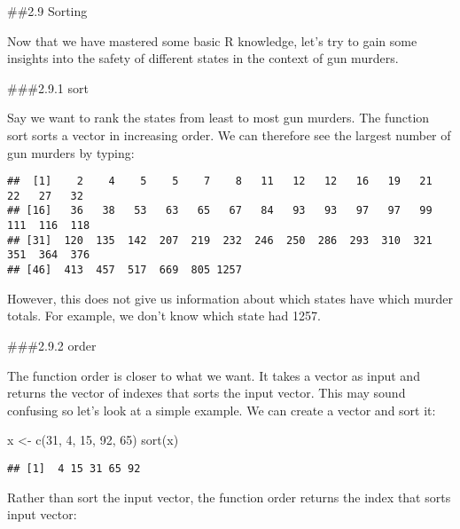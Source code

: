 \documentclass[
]{article}
\newenvironment{Shaded}{\begin{snugshade}}{\end{snugshade}}
\newcommand{\DecValTok}[1]{\textcolor[rgb]{0.00,0.00,0.81}{#1}}
\newcommand{\FunctionTok}[1]{\textcolor[rgb]{0.00,0.00,0.00}{#1}}
\newcommand{\NormalTok}[1]{#1}
\newcommand{\OtherTok}[1]{\textcolor[rgb]{0.56,0.35,0.01}{#1}}
\newcommand{\SpecialCharTok}[1]{\textcolor[rgb]{0.00,0.00,0.00}{#1}}
\begin{document}
\#\#2.9 Sorting

Now that we have mastered some basic R knowledge, let's try to gain some
insights into the safety of different states in the context of gun
murders.

\#\#\#2.9.1 sort

Say we want to rank the states from least to most gun murders. The
function sort sorts a vector in increasing order. We can therefore see
the largest number of gun murders by typing:

\begin{Shaded}
\end{Shaded}

\begin{verbatim}
##  [1]    2    4    5    5    7    8   11   12   12   16   19   21   22   27   32
## [16]   36   38   53   63   65   67   84   93   93   97   97   99  111  116  118
## [31]  120  135  142  207  219  232  246  250  286  293  310  321  351  364  376
## [46]  413  457  517  669  805 1257
\end{verbatim}

However, this does not give us information about which states have which
murder totals. For example, we don't know which state had 1257.

\#\#\#2.9.2 order

The function order is closer to what we want. It takes a vector as input
and returns the vector of indexes that sorts the input vector. This may
sound confusing so let's look at a simple example. We can create a
vector and sort it:

\begin{Shaded}
\begin{Highlighting}[]
\NormalTok{x }\OtherTok{\textless{}{-}} \FunctionTok{c}\NormalTok{(}\DecValTok{31}\NormalTok{, }\DecValTok{4}\NormalTok{, }\DecValTok{15}\NormalTok{, }\DecValTok{92}\NormalTok{, }\DecValTok{65}\NormalTok{)}
\FunctionTok{sort}\NormalTok{(x)}
\end{Highlighting}
\end{Shaded}

\begin{verbatim}
## [1]  4 15 31 65 92
\end{verbatim}

Rather than sort the input vector, the function order returns the index
that sorts input vector:
\end{document}
